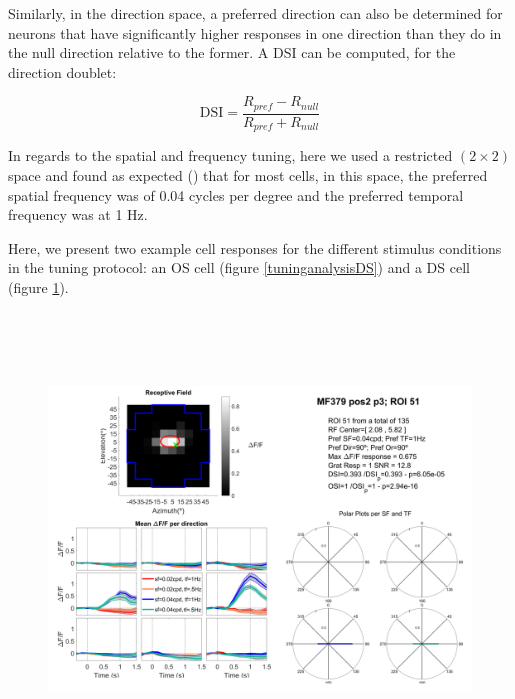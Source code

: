 Similarly, in the direction space, a preferred direction can also be determined for neurons that have significantly higher responses in one direction than they do in the null direction relative to the former. A DSI can be computed, for the direction doublet:

\begin{equation}
\text{DSI}=\dfrac{R_{pref} - R_{null}}{R_{pref} + R_{null}}
\end{equation}

In regards to the spatial and frequency tuning, here we used a restricted $(2 \times 2)$ space and found as expected (\cite{Whichpapershowsthis?}) that for most cells, in this space, the preferred spatial frequency was of 0.04 cycles per degree and the preferred temporal frequency was at 1 Hz.

Here, we present two example cell responses for the different stimulus conditions in the tuning protocol: an OS cell (figure \ref{tuninganalysisDS}) and a DS cell (figure \ref{tuninganalysisOS}).

\begin{figure}[H] \centering \includegraphics[width=12cm,height=12cm,keepaspectratio]{Figures/7.Results/tuning/MF379_pos2_p3_ROI0051.png} 
\label{tuninganalysisOS}
\end{figure}

